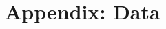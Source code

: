 \documentclass[logo,msc,ai]{infthesis}           %
\begin{document}
\appendix

%

\chapter{Appendix: Data}
\end{document}
